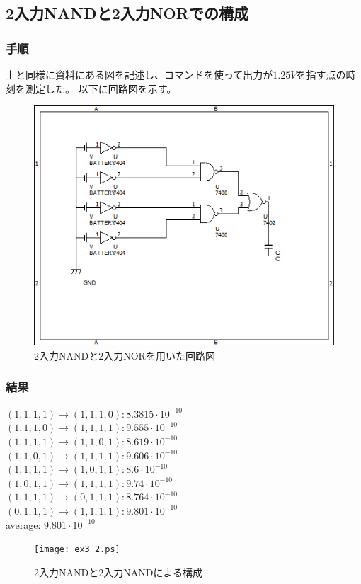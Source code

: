 \documentclass{jsarticle}
\begin{document}
\subsection{2入力NANDと2入力NORでの構成}
\subsubsection{手順}
上と同様に資料にある図を記述し、コマンドを使って出力が$1.25V$を指す点の時刻を測定した。
以下に回路図を示す。
\begin{figure}[H]
    \centering
    \includegraphics[bb=0 0 500 400]{ex3_nand_nand_nor.png}
    \caption{2入力NANDと2入力NORを用いた回路図}
\end{figure}

\subsubsection{結果}
\begin{flushleft}
    $(1,1,1,1) \rightarrow (1,1,1,0) : 8.3815 \cdot 10^{-10}$\\
    $(1,1,1,0) \rightarrow (1,1,1,1) : 9.555 \cdot 10^{-10}$\\
    $(1,1,1,1) \rightarrow (1,1,0,1) : 8.619 \cdot 10^{-10}$\\
    $(1,1,0,1) \rightarrow (1,1,1,1) : 9.606 \cdot 10^{-10}$\\
    $(1,1,1,1) \rightarrow (1,0,1,1) : 8.6 \cdot 10^{-10}$\\
    $(1,0,1,1) \rightarrow (1,1,1,1) : 9.74 \cdot 10^{-10}$\\
    $(1,1,1,1) \rightarrow (0,1,1,1) : 8.764 \cdot 10^{-10}$\\
    $(0,1,1,1) \rightarrow (1,1,1,1) : 9.801 \cdot 10^{-10}$\\
    average: $9.801 \cdot 10^{-10}$
    
    \end{flushleft}
    \begin{figure}[H]
        \hspace{50pt}
        \texttt{[image: ex3\_2.ps]}
        \vspace{30pt}
        \caption{2入力NANDと2入力NANDによる構成}
    \end{figure}
\end{document}
